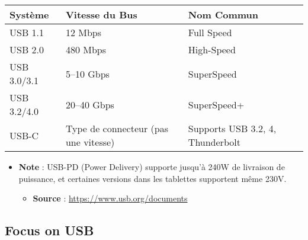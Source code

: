 \documentclass[10pt,a4paper]{article}
\begin{document}
\begin{center}
\begin{tabular}{|l|l|l|}
\hline
\textbf{Système} & \textbf{Vitesse du Bus} & \textbf{Nom Commun} \\
\hline
USB 1.1 & 12 Mbps & Full Speed \\
\hline
USB 2.0 & 480 Mbps & High-Speed \\
\hline
USB 3.0/3.1 & 5–10 Gbps & SuperSpeed \\
\hline
USB 3.2/4.0 & 20–40 Gbps & SuperSpeed+ \\
\hline
USB-C & Type de connecteur (pas une vitesse) & Supports USB 3.2, 4, Thunderbolt \\
\hline
\end{tabular}
\end{center}

\begin{itemize}
    \item \textbf{Note} : USB-PD (Power Delivery) supporte jusqu'à 240W de livraison de puissance, et certaines versions dans les tablettes supportent même 230V.
    \begin{itemize}
        \item \textbf{Source} : \url{https://www.usb.org/documents}
    \end{itemize}
\end{itemize}

\subsection*{Focus on USB}
\end{document}
